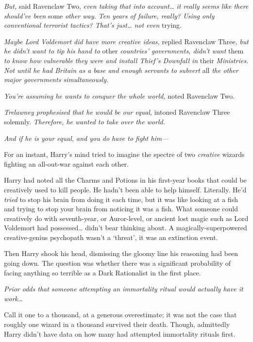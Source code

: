 \emph{But,} said Ravenclaw Two, \emph{even taking that into
account\ldots{} it really seems like there should've been} some
\emph{other way. Ten years of failure, really? Using only conventional
terrorist tactics? That's just\ldots{} not even} trying.

\emph{Maybe Lord Voldemort did have more creative ideas,} replied
Ravenclaw Three, \emph{but he didn't want to tip his hand to} other
\emph{countries' governments, didn't want} them \emph{to know how
vulnerable they were and install Thief's Downfall in} their
\emph{Ministries. Not until he had Britain as a base and enough servants
to subvert} all \emph{the other major governments simultaneously.}

\emph{You're assuming he wants to conquer the whole world,} noted
Ravenclaw Two.

\emph{Trelawney prophesised that he would be our equal,} intoned
Ravenclaw Three solemnly. \emph{Therefore, he wanted to take over the
world.}

\emph{And if he is your equal, and you do have to fight him---}

For an instant, Harry's mind tried to imagine the spectre of two
\emph{creative} wizards fighting an all-out-war against each other.

Harry had noted all the Charms and Potions in his first-year books that
could be creatively used to kill people. He hadn't been able to help
himself. Literally. He'd \emph{tried} to stop his brain from doing it
each time, but it was like looking at a fish and trying to stop your
brain from noticing it was a fish. What someone could creatively do with
seventh-year, or Auror-level, or ancient lost magic such as Lord
Voldemort had possessed\ldots{} didn't bear thinking about. A
magically-superpowered creative-genius psychopath wasn't a `threat', it
was an extinction event.

Then Harry shook his head, dismissing the gloomy line his reasoning had
been going down. The question was whether there was a significant
probability of facing anything so terrible as a Dark Rationalist in the
first place.

\emph{Prior odds that someone attempting an immortality ritual would
actually have it work\ldots{}}

Call it one to a thousand, at a generous overestimate; it was not the
case that roughly one wizard in a thousand survived their death. Though,
admittedly Harry didn't have data on how many had attempted immortality
rituals first.

